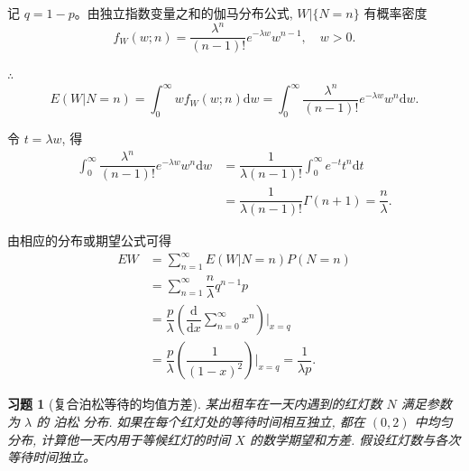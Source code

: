 \documentclass[12pt,fontset=fandol]{ctexart}
\newtheorem{exercise}{习题}[section]
\begin{document}
\begin{solve}\label{a:A6.3}
    记 $q=1-p$。由独立指数变量之和的伽马分布公式, $W|\{N=n\}$ 有概率密度
    \[f_W(w;n)=\dfrac{\lambda^n}{(n-1)!}e^{-\lambda w}w^{n-1},\quad w>0.\]

    $\therefore$
    \[E(W|N=n)=\int_0^\infty wf_W(w;n)\mathrm{d}w=\int_0^\infty\dfrac{\lambda^n}{(n-1)!}e^{-\lambda w}w^n\mathrm{d}w.\]

    令 $t=\lambda w$, 得
    \begin{align*}
        \int_0^\infty\dfrac{\lambda^n}{(n-1)!}e^{-\lambda w}w^n\mathrm{d}w & =\dfrac{1}{\lambda(n-1)!}\int_0^\infty e^{-t}t^n\mathrm{d}t \\
        & =\dfrac{1}{\lambda(n-1)!}\Gamma(n+1)=\dfrac{n}{\lambda}.
    \end{align*}

    由相应的分布或期望公式可得
    \begin{align*}
        EW & =\sum\limits_{n=1}^\infty E(W|N=n)P(N=n) \\
        & =\sum\limits_{n=1}^\infty\dfrac{n}{\lambda}q^{n-1}p \\
        & =\dfrac{p}{\lambda}\left(\dfrac{\mathrm{d}}{\mathrm{d}x}\sum\limits_{n=0}^\infty x^n\right)\Bigg|_{x=q} \\
        & =\dfrac{p}{\lambda}\left(\dfrac{1}{(1-x)^2}\right)\Bigg|_{x=q}=\dfrac{1}{\lambda p}.
    \end{align*}
\end{solve}

\begin{exercise}[复合泊松等待的均值方差]\label{q:A6.4}
某出租车在一天内遇到的红灯数 $N$ 满足参数为 $\lambda$ 的 泊松 分布. 如果在每个红灯处的等待时间相互独立, 都在 $(0,2)$ 中均匀分布, 计算他一天内用于等候红灯的时间 $X$ 的数学期望和方差. 假设红灯数与各次等待时间独立。\par{}
\end{exercise}
\end{document}
